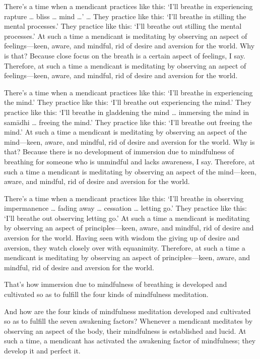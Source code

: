 \documentclass[12pt,openany]{book}%
\begin{document}
There’s a time when a mendicant practices like this: ‘I’ll breathe in experiencing rapture … bliss … mind …’ … They practice like this: ‘I’ll breathe in stilling the mental processes.’ They practice like this: ‘I’ll breathe out stilling the mental processes.’ At such a time a mendicant is meditating by observing an aspect of feelings—keen, aware, and mindful, rid of desire and aversion for the world. Why is that? Because close focus on the breath is a certain aspect of feelings, I say. Therefore, at such a time a mendicant is meditating by observing an aspect of feelings—keen, aware, and mindful, rid of desire and aversion for the world. 

There’s a time when a mendicant practices like this: ‘I’ll breathe in experiencing the mind.’ They practice like this: ‘I’ll breathe out experiencing the mind.’ They practice like this: ‘I’ll breathe in gladdening the mind … immersing the mind in \textsanskrit{samādhi} … freeing the mind.’ They practice like this: ‘I’ll breathe out freeing the mind.’ At such a time a mendicant is meditating by observing an aspect of the mind—keen, aware, and mindful, rid of desire and aversion for the world. Why is that? Because there is no development of immersion due to mindfulness of breathing for someone who is unmindful and lacks awareness, I say. Therefore, at such a time a mendicant is meditating by observing an aspect of the mind—keen, aware, and mindful, rid of desire and aversion for the world. 

There’s a time when a mendicant practices like this: ‘I’ll breathe in observing impermanence … fading away … cessation … letting go.’ They practice like this: ‘I’ll breathe out observing letting go.’ At such a time a mendicant is meditating by observing an aspect of principles—keen, aware, and mindful, rid of desire and aversion for the world. Having seen with wisdom the giving up of desire and aversion, they watch closely over with equanimity. Therefore, at such a time a mendicant is meditating by observing an aspect of principles—keen, aware, and mindful, rid of desire and aversion for the world. 

That’s how immersion due to mindfulness of breathing is developed and cultivated so as to fulfill the four kinds of mindfulness meditation. 

And how are the four kinds of mindfulness meditation developed and cultivated so as to fulfill the seven awakening factors? Whenever a mendicant meditates by observing an aspect of the body, their mindfulness is established and lucid. At such a time, a mendicant has activated the awakening factor of mindfulness; they develop it and perfect it. 
\end{document}
